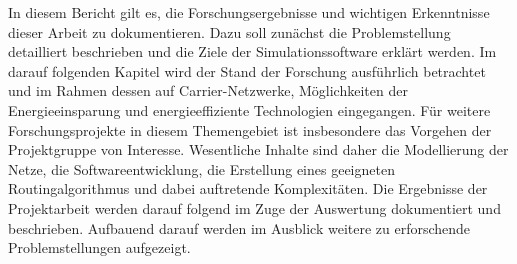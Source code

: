 In diesem Bericht gilt es, die Forschungsergebnisse und wichtigen Erkenntnisse dieser Arbeit zu dokumentieren. Dazu soll zunächst die Problemstellung detailliert beschrieben und die Ziele der Simulationssoftware erklärt werden. Im darauf folgenden Kapitel wird der Stand der Forschung ausführlich betrachtet und im Rahmen dessen auf Carrier-Netzwerke, Möglichkeiten der Energieeinsparung und energieeffiziente Technologien eingegangen. Für weitere Forschungsprojekte in diesem Themengebiet ist insbesondere das Vorgehen der Projektgruppe von Interesse. Wesentliche Inhalte sind daher die Modellierung der Netze, die Softwareentwicklung, die Erstellung eines geeigneten Routingalgorithmus und dabei auftretende Komplexitäten. Die Ergebnisse der Projektarbeit werden darauf folgend im Zuge der Auswertung dokumentiert und beschrieben. Aufbauend darauf werden im Ausblick weitere zu erforschende Problemstellungen aufgezeigt. 



